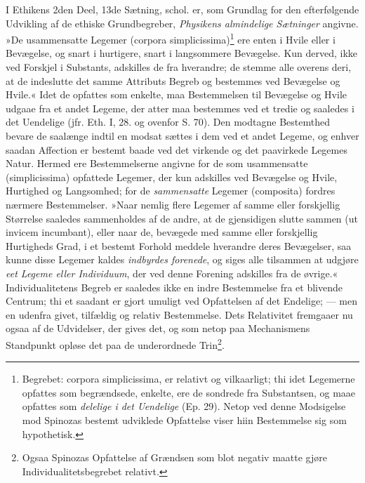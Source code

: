 \documentclass[12pt,a4paper]{book}
\newcommand{\opage}[1]{\marginnote{\footnotesize\textit{[#1]}}}
\begin{document}
I Ethikens 2den Deel, 13de Sætning, schol. er, som Grundlag for
den efterfølgende Udvikling af de ethiske Grundbegreber, \emph{Physikens
almindelige Sætninger} angivne.
»De usammensatte Legemer (corpora
simplicissima)\footnote{Begrebet: corpora simplicissima, er
relativt og vilkaarligt; thi idet Legemerne opfattes som
begrændsede, enkelte, ere de sondrede fra Substantsen, og maae
opfattes som \emph{delelige i det Uendelige} (Ep. 29). Netop ved denne
Modsigelse mod Spinozas bestemt udviklede Opfattelse viser hiin
Bestemmelse sig som hypothetisk.} ere enten i Hvile eller i
Bevægelse, og snart i hurtigere, snart i langsommere Bevægelse.
Kun derved, ikke ved Forskjel i Substants, adskilles de fra
hverandre; de stemme alle overens deri, at de indeslutte det
samme Attributs Begreb og bestemmes ved Bevægelse og Hvile.«
Idet de opfattes som enkelte, maa Bestemmelsen til Bevægelse og
Hvile udgaae fra et andet Legeme, der atter maa bestemmes ved et
tredie og saaledes i det Uendelige (jfr. Eth. I, 28. og ovenfor
S. 70). Den modtagne Bestemthed bevare de saalænge indtil en
modsat sættes i dem ved et andet Legeme, og enhver saadan
Affection er bestemt baade ved det virkende og det paavirkede
Legemes Natur. Hermed ere Bestemmelserne angivne for de som
usammensatte (simplicissima) opfattede Legemer, der kun adskilles
ved Bevægelse og Hvile, Hurtighed og Langsomhed; for de
\emph{sammensatte} Legemer (composita) fordres nærmere Bestemmelser.
»Naar nemlig flere Legemer af samme eller forskjellig Størrelse
saaledes sammenholdes af de andre, at de gjensidigen slutte
sammen (ut invicem incumbant), eller naar de, bevægede med samme
eller forskjellig Hurtigheds Grad, i et bestemt Forhold meddele
hverandre deres Bevægelser, saa kunne disse Legemer kaldes
\emph{indbyrdes forenede}, og siges alle tilsammen at udgjøre \emph{eet
Legeme eller Individuum}, der ved denne
\opage{80} \setcounter{footnote}{0}%
Forening adskilles fra de øvrige.« Individualitetens Begreb er
saaledes ikke en indre Bestemmelse fra et blivende Centrum; thi
et saadant er gjort umuligt ved Opfattelsen af det Endelige; ---
men en udenfra givet, tilfældig og relativ Bestemmelse. Dets
Relativitet fremgaaer nu ogsaa af de Udvidelser, der gives det,
og som netop paa Mechanismens Standpunkt opløse det paa de
underordnede Trin\footnote{Ogsaa Spinozas Opfattelse af Grændsen
som blot negativ maatte gjøre Individualitetsbegrebet relativt.}.
\end{document}
